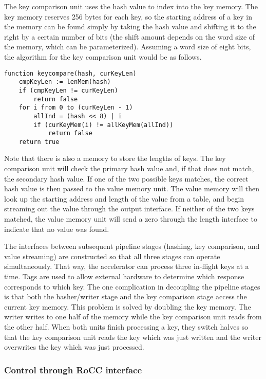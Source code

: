 The key comparison unit uses the hash value to index into the key memory.
The key memory reserves 256 bytes for each key, so the starting address of a
key in the memory can be found simply by taking the hash value and shifting it
to the right by a certain number of bits (the shift amount depends on the
word size of the memory, which can be parameterized). Assuming a word size
of eight bits, the algorithm for the key comparison unit would be as follows.

\begin{verbatim}
function keycompare(hash, curKeyLen)
    cmpKeyLen := lenMem(hash)
    if (cmpKeyLen != curKeyLen)
        return false
    for i from 0 to (curKeyLen - 1)
        allInd = (hash << 8) | i
        if (curKeyMem(i) != allKeyMem(allInd))
            return false
    return true
\end{verbatim}

Note that there is also a memory to store the lengths of keys.
The key comparison unit will check the primary hash value and, if that does
not match, the secondary hash value. If one of the two possible keys matches,
the correct hash value is then passed to the value memory unit. The value
memory will then look up the starting address and length of the value from a
table, and begin streaming out the value through the output interface.
If neither of the two keys matched, the value memory unit will send
a zero through the length interface to indicate that no value was found.

The interfaces between subsequent pipeline stages (hashing, key comparison,
and value streaming) are constructed so that all three stages can operate
simultaneously. That way, the accelerator can process three in-flight keys
at a time. Tags are used to allow external hardware to determine which
response corresponds to which key. The one complication in decoupling the
pipeline stages is that both the hasher/writer stage and the key comparison
stage access the current key memory. This problem is solved by doubling the
key memory. The writer writes to one half of the memory while the key
comparison unit reads from the other half. When both units finish processing
a key, they switch halves so that the key comparison unit reads the key which
was just written and the writer overwrites the key which was just processed.

\subsubsection{Control through RoCC interface}

